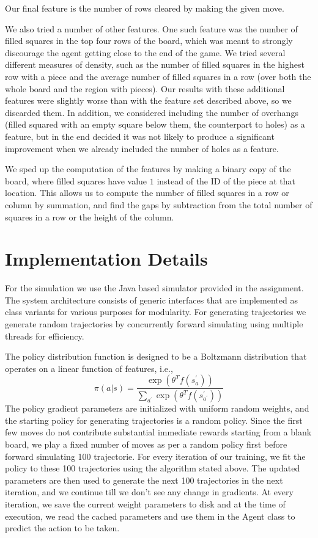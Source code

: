 \documentclass[11pt]{article}
\begin{document}
Our final feature is the number of rows cleared by making the given move.

We also tried a number of other features.  One such feature was the number of filled squares in the top four rows of the board, which was meant to strongly discourage the agent getting close to the end of the game.  We tried several different measures of density, such as the number of filled squares in the highest row with a piece and the average number of filled squares in a row (over both the whole board and the region with pieces).  Our results with these additional features were slightly worse than with the feature set described above, so we discarded them.  In addition, we considered including the number of overhangs (filled squared with an empty square below them, the counterpart to holes) as a feature, but in the end decided it was not likely to produce a significant improvement when we already included the number of holes as a feature.

We sped up the computation of the features by making a binary copy of the board, where filled squares have value $1$ instead of the ID of the piece at that location.  This allows us to compute the number of filled squares in a row or column by summation, and find the gaps by subtraction from the total number of squares in a row or the height of the column.


\section{Implementation Details}
For the simulation we use the Java based simulator provided in the assignment. The system architecture consists of generic interfaces that are implemented as class variants for various purposes for modularity. For generating trajectories we generate random trajectories by concurrently forward simulating using multiple threads for efficiency.

The policy distribution function is designed to be a Boltzmann distribution that operates on a linear function of features, i.e.,
\[ \pi(a|s)=\frac{\exp\left(\theta^{T}f\left(s_{a}^{\prime}\right)\right)}{\underset{a^{\prime}}{\sum}\exp\left(\theta^{T}f\left(s_{a^{\prime}}^{\prime}\right)\right)} \]
 The policy gradient parameters are initialized with uniform random weights, and the starting policy for generating trajectories is a random policy. Since the first few moves do not contribute substantial immediate rewards starting from a blank board, we play a fixed number of moves as per a random policy first before forward simulating 100 trajectorie. For every iteration of our training, we fit the policy to these 100 trajectories using the algorithm stated above. The updated parameters are then used to generate the next 100 trajectories in the next iteration, and we continue till we don't see any change in gradients. At every iteration, we save the current weight parameters to disk and at the time of execution, we read the cached parameters and use them in the Agent class to predict the action to be taken.
 
\end{document}
